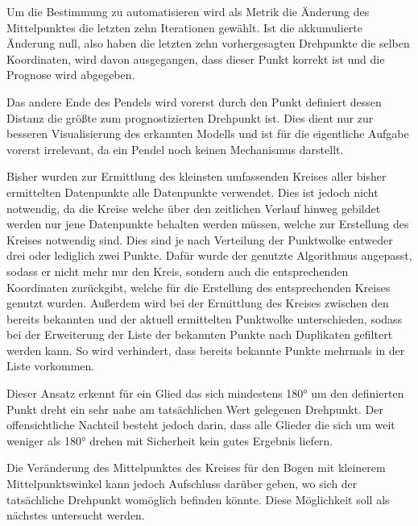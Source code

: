 Um die Bestimmung zu automatisieren wird als Metrik die Änderung des Mittelpunktes die letzten zehn Iterationen gewählt.
Ist die akkumulierte Änderung null, also haben die letzten zehn vorhergesagten Drehpunkte die selben Koordinaten, wird davon ausgegangen, dass dieser Punkt korrekt ist und die Prognose wird abgegeben.

Das andere Ende des Pendels wird vorerst durch den Punkt definiert dessen Distanz die größte zum prognostizierten Drehpunkt ist.
Dies dient nur zur besseren Visualisierung des erkannten Modells und ist für die eigentliche Aufgabe vorerst irrelevant, da ein Pendel noch keinen Mechanismus darstellt.


Bisher wurden zur Ermittlung des kleinsten umfassenden Kreises aller bisher ermittelten Datenpunkte alle Datenpunkte verwendet.
Dies ist jedoch nicht notwendig, da die Kreise welche über den zeitlichen Verlauf hinweg gebildet werden nur jene Datenpunkte behalten werden müssen, welche zur Erstellung des Kreises notwendig sind.
Dies sind je nach Verteilung der Punktwolke entweder drei oder lediglich zwei Punkte.
Dafür wurde der genutzte Algorithmus %
angepasst, sodass er nicht mehr nur den Kreis, sondern auch die entsprechenden Koordinaten zurückgibt, welche für die Erstellung des entsprechenden Kreises genutzt wurden.
Außerdem wird bei der Ermittlung des Kreises zwischen den bereits bekannten und der aktuell ermittelten Punktwolke unterschieden, sodass bei der Erweiterung der Liste der bekannten Punkte nach Duplikaten gefiltert werden kann.
So wird verhindert, dass bereits bekannte Punkte mehrmals in der Liste vorkommen.

Dieser Ansatz erkennt für ein Glied das sich mindestens 180° um den definierten Punkt dreht ein sehr nahe am tatsächlichen Wert gelegenen Drehpunkt.
Der offensichtliche Nachteil besteht jedoch darin, dass alle Glieder die sich um weit weniger als 180° drehen mit Sicherheit kein gutes Ergebnis liefern.

Die Veränderung des Mittelpunktes des Kreises für den Bogen mit kleinerem Mittelpunktswinkel kann jedoch Aufschluss darüber geben, wo sich der tatsächliche Drehpunkt womöglich befinden könnte.
Diese Möglichkeit soll als nächstes untersucht werden.


